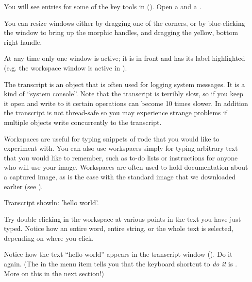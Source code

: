 \documentclass[a4paper,10pt,twoside]{book}
\begin{document}
You will see entries for some of the key tools in \sq ().
Open a  and a .

You can resize windows either by dragging one of the corners, or by blue-clicking the window to bring up the morphic handles, and dragging the yellow, bottom right handle.

At any time only one window is active; it is in front and has its label highlighted (e.g. the workspace window is active in ).

The transcript is an object that is often used for logging system messages.
It is a kind of ``system console''.
Note that the transcript is terribly slow, so if you keep it open and write to it certain operations can become 10 times slower.
In addition the transcript is not thread-safe so you may experience strange problems if multiple objects write concurrently to the transcript.

Workspaces are useful for typing snippets of \st code that you would like to experiment with.
You can also use workspaces simply for typing arbitrary text that you would like to remember, such as to-do lists or instructions for anyone who will use your image.
Workspaces are often used to hold documentation about a captured image, as is the case with the standard image that we downloaded earlier (see ).

\begin{code}{}
Transcript showln: 'hello world'.
\end{code}

Try double-clicking in the workspace at various points in the text you have just typed.
Notice how an entire word, entire string, or the whole text is selected, depending on where you click.

Notice how the text ``hello world'' appears in the transcript window
().
Do it again.
(The  in the menu item  tells you that the keyboard shortcut to \emph{do it} is . More on this in the next section!)
\end{document}
